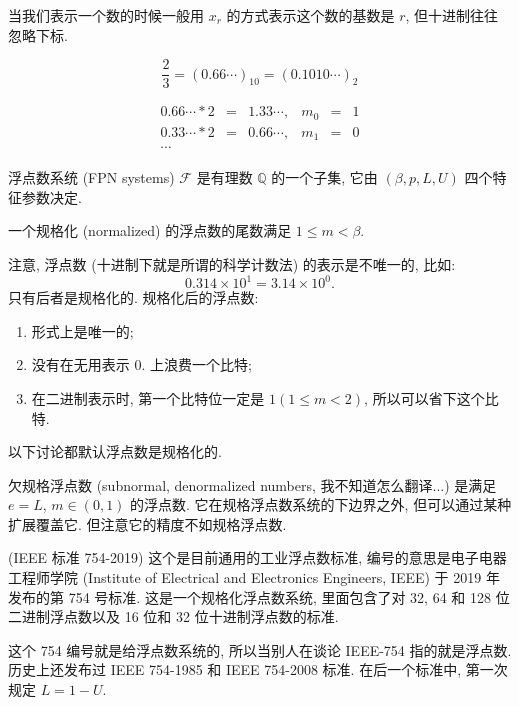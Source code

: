\documentclass[a4paper]{ctexart}
\begin{document}
{当我们表示一个数的时候一般用 $x_r$ 的方式表示这个数的基数是 $r$,
但十进制往往忽略下标.

$$
\frac{2}{3} = (0.66\cdots)_{10} = (0.1010\cdots)_2
$$

$$
\begin{array}{rclrcl}
  0.66\cdots * 2 &=& 1.33\cdots, & m_0 &=& 1 \\
  0.33\cdots * 2 &=& 0.66\cdots, & m_1 &=& 0 \\
  \cdots&&&&&
\end{array}
$$

 浮点数系统 (FPN systems) $\mathscr{F}$ 是有理数
$\mathbb{Q}$ 的一个子集, 它由 $(\beta, p, L, U)$ 四个特征参数决定.

 一个规格化 (normalized) 的浮点数的尾数满足
$1 \leq m < \beta$.

注意, 浮点数 (十进制下就是所谓的科学计数法) 的表示是不唯一的, 比如:
$$
0.314 \times 10^1 = 3.14 \times 10^0.
$$
只有后者是规格化的. 规格化后的浮点数:
\begin{enumerate}
\item 形式上是唯一的;
\item 没有在无用表示 $0.$ 上浪费一个比特;
\item 在二进制表示时, 第一个比特位一定是 $1(1 \leq m < 2)$,
  所以可以省下这个比特.
\end{enumerate}
以下讨论都默认浮点数是规格化的.

 欠规格浮点数 (subnormal, denormalized numbers,
我不知道怎么翻译...) 是满足 $e = L$, $m \in (0, 1)$ 的浮点数.
它在规格浮点数系统的下边界之外, 但可以通过某种扩展覆盖它.
但注意它的精度不如规格浮点数.

 (IEEE 标准 754-2019) 这个是目前通用的工业浮点数标准,
编号的意思是电子电器工程师学院
(Institute of Electrical and Electronics Engineers, IEEE) 于 2019 年发布的第
754 号标准. 这是一个规格化浮点数系统, 里面包含了对 32, 64 和 128 位二进制浮点数以及
16 位和 32 位十进制浮点数的标准.

这个 754 编号就是给浮点数系统的, 所以当别人在谈论 IEEE-754 指的就是浮点数.
历史上还发布过 IEEE 754-1985 和 IEEE 754-2008 标准.
在后一个标准中, 第一次规定 $L = 1 - U$.

}
\end{document}
